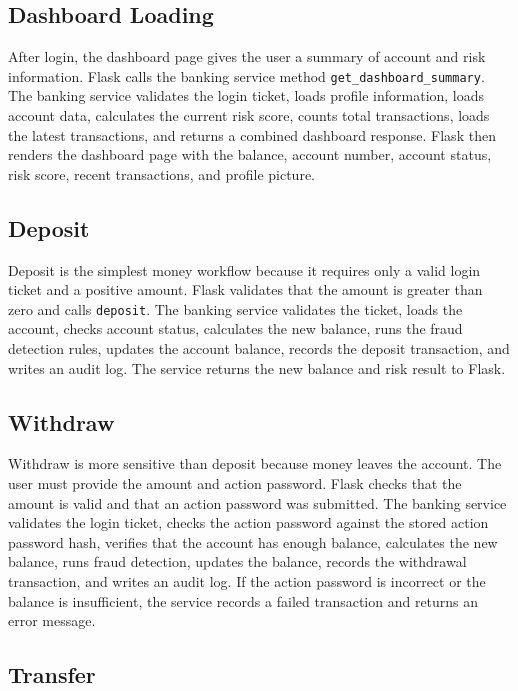 \documentclass[12pt,a4paper]{article}
\newcommand{\subsectionbreakguard}{\Needspace{5\baselineskip}}
\begin{document}
\subsectionbreakguard
\subsection{Dashboard Loading}

After login, the dashboard page gives the user a summary of account and risk information. Flask calls the banking service method \texttt{get\_dashboard\_summary}. The banking service validates the login ticket, loads profile information, loads account data, calculates the current risk score, counts total transactions, loads the latest transactions, and returns a combined dashboard response. Flask then renders the dashboard page with the balance, account number, account status, risk score, recent transactions, and profile picture.

\subsectionbreakguard
\subsection{Deposit}

Deposit is the simplest money workflow because it requires only a valid login ticket and a positive amount. Flask validates that the amount is greater than zero and calls \texttt{deposit}. The banking service validates the ticket, loads the account, checks account status, calculates the new balance, runs the fraud detection rules, updates the account balance, records the deposit transaction, and writes an audit log. The service returns the new balance and risk result to Flask.

\subsectionbreakguard
\subsection{Withdraw}

Withdraw is more sensitive than deposit because money leaves the account. The user must provide the amount and action password. Flask checks that the amount is valid and that an action password was submitted. The banking service validates the login ticket, checks the action password against the stored action password hash, verifies that the account has enough balance, calculates the new balance, runs fraud detection, updates the balance, records the withdrawal transaction, and writes an audit log. If the action password is incorrect or the balance is insufficient, the service records a failed transaction and returns an error message.

\subsectionbreakguard
\subsection{Transfer}
\end{document}
